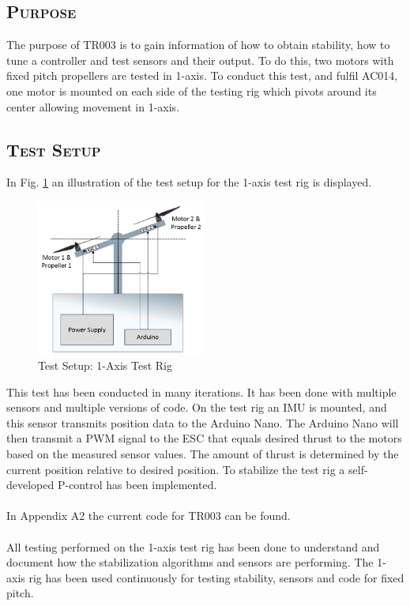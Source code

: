 \subsection*{\textsc{\medium Purpose}}
The purpose of TR003 is to gain information of how to obtain stability, how to tune a controller and test sensors and their output. To do this, two motors with fixed pitch propellers are tested in 1-axis. To conduct this test, and fulfil AC014, one motor is mounted on each side of the testing rig which pivots around its center allowing movement in 1-axis. 

\subsection*{\textsc{\medium Test Setup}}
In Fig. \ref{fig:testsetup3} an illustration of the test setup for the 1-axis test rig is displayed. 
\begin{figure}[H]
    \centering
    \includegraphics[width = 0.5\textwidth]{VAPIQ-PICTURES/TestSetup3}
    \caption{Test Setup: 1-Axis Test Rig}
    \label{fig:testsetup3}
\end{figure}

This test has been conducted in many iterations. It has been done with multiple sensors and multiple versions of code. On the test rig an IMU is mounted, and this sensor transmits position data to the Arduino Nano. The Arduino Nano will then transmit a PWM signal to the ESC that equals desired thrust to the motors based on the measured sensor values. The amount of thrust is determined by the current position relative to desired position. To stabilize the test rig a self-developed P-control has been implemented. \\
\\
In Appendix A2 the current code for TR003 can be found.\\
\\
All testing performed on the 1-axis test rig has been done to understand and document how the stabilization algorithms and sensors are performing. The 1-axis rig has been used continuously for testing stability, sensors and code for fixed pitch. 


